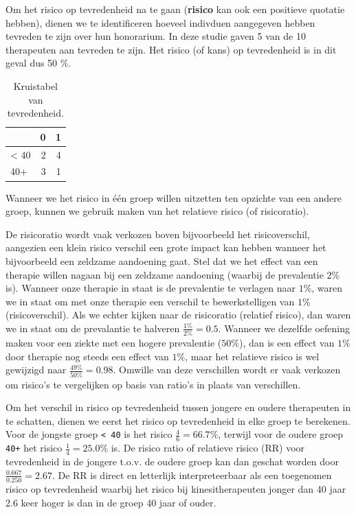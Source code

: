 \documentclass[
]{book}
\theoremstyle{definition}
\theoremstyle{definition}
\theoremstyle{definition}
\theoremstyle{definition}
\theoremstyle{remark}
\begin{document}
Om het risico op tevredenheid na te gaan (\textbf{risico} kan ook een positieve quotatie hebben), dienen we te identificeren hoeveel indivduen aangegeven hebben tevreden te zijn over hun honorarium. In deze studie gaven 5 van de 10 therapeuten aan tevreden te zijn. Het risico (of kans) op tevredenheid is in dit geval dus 50 \(\%\).

\begin{table}

\caption{\label{tab:teveredenX}Kruistabel van tevredenheid.}
\centering
\begin{tabular}[t]{lrr}
\toprule
  & 0 & 1\\
\midrule
< 40 & 2 & 4\\
40+ & 3 & 1\\
\bottomrule
\end{tabular}
\end{table}

Wanneer we het risico in één groep willen uitzetten ten opzichte van een andere groep, kunnen we gebruik maken van het relatieve risico (of risicoratio).

De risicoratio wordt vaak verkozen boven bijvoorbeeld het risicoverschil, aangezien een klein risico verschil een grote impact kan hebben wanneer het bijvoorbeeld een zeldzame aandoening gaat. Stel dat we het effect van een therapie willen nagaan bij een zeldzame aandoening (waarbij de prevalentie \(2 \%\) is). Wanneer onze therapie in staat is de prevalentie te verlagen naar \(1 \%\), waren we in staat om met onze therapie een verschil te bewerkstelligen van \(1 \%\) (risicoverschil). Als we echter kijken naar de risicoratio (relatief risico), dan waren we in staat om de prevalantie te halveren \(\frac{1\%}{2\%} = 0.5\). Wanneer we dezelfde oefening maken voor een ziekte met een hogere prevalentie (\(50\%\)), dan is een effect van \(1\%\) door therapie nog steeds een effect van \(1\%\), maar het relatieve risico is wel gewijzigd naar \(\frac{49\%}{50\%} = 0.98\). Omwille van deze verschillen wordt er vaak verkozen om risico's te vergelijken op basis van ratio's in plaats van verschillen.

Om het verschil in risico op tevredenheid tussen jongere en oudere therapeuten in te schatten, dienen we eerst het risico op tevredenheid in elke groep te berekenen. Voor de jongste groep \texttt{\textless{}\ 40} is het risico \(\frac{4}{6} = 66.7 \%\), terwijl voor de oudere groep \texttt{40+} het risico \(\frac{1}{4} = 25.0 \%\) is. De risico ratio of relatieve risico (RR) voor tevredenheid in de jongere t.o.v. de oudere groep kan dan geschat worden door \(\frac{0.667}{0.250} = 2.67\). De RR is direct en letterlijk interpreteerbaar als een toegenomen risico op tevredenheid waarbij het risico bij kinesitherapeuten jonger dan 40 jaar 2.6 keer hoger is dan in de groep 40 jaar of ouder.
\end{document}
